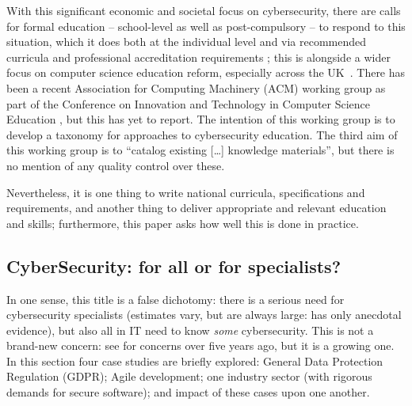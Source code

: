 \documentclass[conference]{IEEEtran}
\begin{document}
With this significant economic and societal focus on cybersecurity, there are calls for formal education -- school-level as well as post-compulsory -- to respond to this situation, which it does both at the individual level and via recommended curricula \cite{ACM2013a} and professional accreditation requirements \cite{BCS2018a}; this is alongside a wider focus on computer science education reform, especially across the UK~\cite{%
brown-et-al:toce2014,%
murphy-et-al:programming2017%
}. There has been a recent Association for Computing Machinery (ACM)  working group as part of the Conference on Innovation and Technology in Computer Science Education \cite{Parrishetal2018a}, but this has yet to report.  The intention of this working group is to develop a taxonomy for approaches to cybersecurity education. The third aim of this working group is to ``catalog existing [\dots] knowledge materials'', but there is no mention of any quality control over these.

Nevertheless, it is one thing to write national curricula, specifications and requirements, and
another thing to deliver appropriate and relevant education and skills; furthermore, this paper asks how well this is done in practice.

\subsection{CyberSecurity: for all or for specialists?}
In one sense, this title is a false dichotomy: there is a serious need for cybersecurity specialists (estimates vary, but are always large: \cite{JCNSS2018a} has only anecdotal evidence), but also all in IT need to know \emph{some} cybersecurity. This is not a brand-new concern: see \cite{Parr2014a} for concerns over five years ago, but it is a growing one. In this section four case studies are briefly explored: General Data Protection Regulation (GDPR); Agile development; one industry sector (with rigorous demands for secure software); and impact of these cases upon one another.
\end{document}
